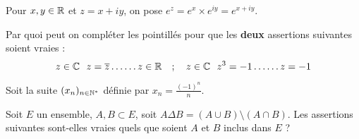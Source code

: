 \begin{question}
Pour $x,y \in \mathbb{R}$ et $z=x+iy$, on pose $e^z=e^x \times
e^{iy}=e^{x+iy}$.
\begin{answers}




\end{answers}
\end{question}


\begin{question}
Par quoi peut on compléter les pointillés pour que les
\textbf{deux} assertions suivantes soient vraies :
$$ z\in \mathbb{C} \ \ z=\overline{z} \ldots\ldots z\in \mathbb{R} \quad ; \quad z\in \mathbb{C} \ \ z^3=-1 \ldots\ldots z=-1$$
\begin{answers}




\end{answers}
\end{question}


\begin{question}
Soit la suite $(x_n)_{n\in\mathbb{N}^*}$ définie par $x_n =
\frac{(-1)^n}{n}$.
\begin{answers}




\end{answers}
\end{question}


\begin{question}
 Soit $E$ un ensemble, $A,B \subset E$, soit $A\Delta B = (A\cup B)\setminus(A\cap B)$.
Les assertions suivantes sont-elles vraies quels que soient $A$ et
$B$ inclus dans $E$ ?
\begin{answers}




\end{answers}
\end{question}


